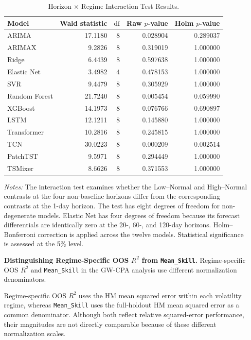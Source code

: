 \documentclass[runningheads,orivec]{llncs}
\begin{document}
\begin{table}[htbp]
\centering
\caption{Horizon $\times$ Regime Interaction Test Results.}\label{tab:h2_interaction}
\setlength{\tabcolsep}{6pt}
\begin{tabular}{lrrrr}
\hline
Model & Wald statistic & $\mathrm{df}$ & Raw $p$-value & Holm $p$-value \\
\hline
ARIMA         & 17.1180 & 8 & 0.028904 & 0.289037 \\
ARIMAX        &  9.2826 & 8 & 0.319019 & 1.000000 \\
Ridge         &  6.4439 & 8 & 0.597638 & 1.000000 \\
Elastic Net   &  3.4982 & 4 & 0.478153 & 1.000000 \\
SVR           &  9.4479 & 8 & 0.305929 & 1.000000 \\
Random Forest & 21.7240 & 8 & 0.005454 & 0.059990 \\
XGBoost       & 14.1973 & 8 & 0.076766 & 0.690897 \\
LSTM          & 12.1211 & 8 & 0.145880 & 1.000000 \\
Transformer   & 10.2816 & 8 & 0.245815 & 1.000000 \\
TCN           & 30.0223 & 8 & 0.000209 & 0.002514 \\
PatchTST      &  9.5971 & 8 & 0.294449 & 1.000000 \\
TSMixer       &  8.6626 & 8 & 0.371553 & 1.000000 \\
\hline
\end{tabular}
\par\vspace{4pt}\parbox{\linewidth}{\scriptsize\textit{Notes:} The interaction test examines whether the Low--Normal and High--Normal contrasts at the four non-baseline horizons differ from the corresponding contrasts at the 1-day horizon. The test has eight degrees of freedom for non-degenerate models. Elastic Net has four degrees of freedom because its forecast differentials are identically zero at the 20-, 60-, and 120-day horizons. Holm--Bonferroni correction is applied across the twelve models. Statistical significance is assessed at the 5\% level.}
\end{table}

\noindent\textbf{Distinguishing Regime-Specific OOS $R^2$ from \texttt{Mean\_Skill}.}
Regime-specific OOS $R^2$ and \texttt{Mean\_Skill} in the GW-CPA analysis use different normalization denominators.

Regime-specific OOS $R^2$ uses the HM mean squared error within each volatility regime, whereas \texttt{Mean\_Skill} uses the full-holdout HM mean squared error as a common denominator. Although both reflect relative squared-error performance, their magnitudes are not directly comparable because of these different normalization scales.
\end{document}
